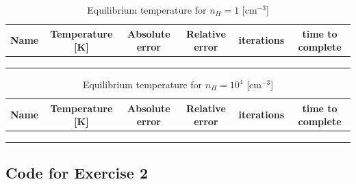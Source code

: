 \documentclass{article}
\newcommand{\CodeDir}{Code}
\newcommand{\CalcDir}{Calculations}
\begin{document}
\begin{table}[H]
\centering
\caption{Equilibrium temperature for $n_H = 1$ [cm\(^{-3}\)]}
\begin{tabular}{|c|c|c|c|c|c|}
\hline
Name & Temperature [K] & Absolute error & Relative error & iterations & time to complete \\
\hline
 \\
 \\
 \\
\hline
\end{tabular}
\end{table}

\begin{table}[H]
\centering
\caption{Equilibrium temperature for $n_H = 10^{4}$ [cm\(^{-3}\)] }
\begin{tabular}{|c|c|c|c|c|c|}
\hline
Name & Temperature [K] & Absolute error & Relative error & iterations & time to complete \\
\hline
 \\
 \\
 \\
\hline
\end{tabular}
\end{table}


\subsection{Code for Exercise 2}

 
\end{document}

